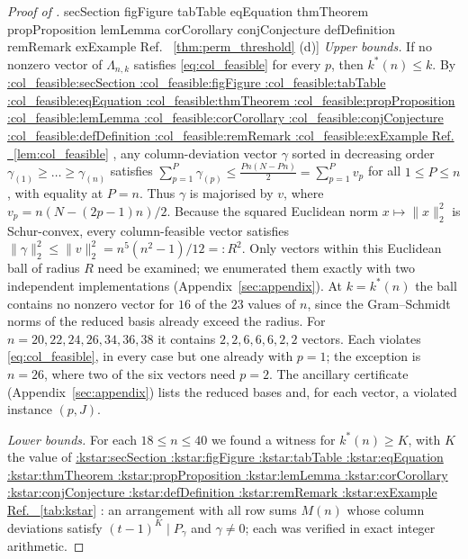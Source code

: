 \documentclass[11pt,a4paper]{article}
\makeatletter
\def\Cref@getprefix#1:#2\relax{#1}
\def\Cref@prefix@sec{sec}
\def\Cref@prefix@fig{fig}
\def\Cref@prefix@tab{tab}
\def\Cref@prefix@eq{eq}
\def\Cref@prefix@thm{thm}
\def\Cref@prefix@prop{prop}
\def\Cref@prefix@lem{lem}
\def\Cref@prefix@cor{cor}
\def\Cref@prefix@conj{conj}
\def\Cref@prefix@def{def}
\def\Cref@prefix@rem{rem}
\def\Cref@prefix@ex{ex}
\def\Cref@type@cap#1{%
  \edef\Cref@tmp{#1}%
  \ifx\Cref@tmp\Cref@prefix@sec Section%
  \else\ifx\Cref@tmp\Cref@prefix@fig Figure%
  \else\ifx\Cref@tmp\Cref@prefix@tab Table%
  \else\ifx\Cref@tmp\Cref@prefix@eq Equation%
  \else\ifx\Cref@tmp\Cref@prefix@thm Theorem%
  \else\ifx\Cref@tmp\Cref@prefix@prop Proposition%
  \else\ifx\Cref@tmp\Cref@prefix@lem Lemma%
  \else\ifx\Cref@tmp\Cref@prefix@cor Corollary%
  \else\ifx\Cref@tmp\Cref@prefix@conj Conjecture%
  \else\ifx\Cref@tmp\Cref@prefix@def Definition%
  \else\ifx\Cref@tmp\Cref@prefix@rem Remark%
  \else\ifx\Cref@tmp\Cref@prefix@ex Example%
  \else Ref.%
  \fi\fi\fi\fi\fi\fi\fi\fi\fi\fi\fi\fi
}
\DeclareRobustCommand{\Cref}[1]{%
  \begingroup
  \edef\Cref@label{#1}%
  \edef\Cref@prefix{\expandafter\Cref@getprefix\Cref@label:\relax}%
  \hyperref[#1]{\Cref@type@cap{\Cref@prefix}~\ref*{#1}}%
  \endgroup
}
\theoremstyle{plain}
\theoremstyle{definition}
\theoremstyle{remark}
\makeatother
\begin{document}
\begin{proof}[Proof of \Cref{thm:perm_threshold}(d)]
\emph{Upper bounds.}  If no nonzero vector of $\Lambda_{n,k}$ satisfies \eqref{eq:col_feasible} for every $p$, then $k^*(n)\le k$.
By \Cref{lem:col_feasible}, any column-deviation vector $\gamma$ sorted in decreasing order $\gamma_{(1)}\ge\dots\ge\gamma_{(n)}$ satisfies $\sum_{p=1}^P\gamma_{(p)}\le \frac{Pn(N-Pn)}{2}=\sum_{p=1}^P v_p$ for all $1\le P\le n$, with equality at $P=n$. Thus $\gamma$ is majorised by $v$, where $v_p=n(N-(2p-1)n)/2$. Because the squared Euclidean norm $x\mapsto\|x\|_2^2$ is Schur-convex, every column-feasible vector satisfies $\|\gamma\|_2^2\le\|v\|_2^2=n^5(n^2-1)/12=:R^2$. Only vectors within this Euclidean ball of radius $R$ need be examined; we enumerated them exactly with two independent implementations (Appendix~\ref{sec:appendix}).
At $k=k^*(n)$ the ball contains no nonzero vector for $16$ of the $23$ values of $n$, since the Gram--Schmidt norms of the reduced basis already exceed the radius.
For $n=20,22,24,26,34,36,38$ it contains $2,2,6,6,6,2,2$ vectors.
Each violates \eqref{eq:col_feasible}, in every case but one already with $p=1$; the exception is $n=26$, where two of the six vectors need $p=2$.
The ancillary certificate (Appendix~\ref{sec:appendix}) lists the reduced bases and, for each vector, a violated instance $(p,J)$.

\emph{Lower bounds.}  For each $18\le n\le40$ we found a witness for $k^*(n)\ge K$, with $K$ the value of \Cref{tab:kstar}: an arrangement with all row sums $M(n)$ whose column deviations satisfy $(t-1)^{K}\mid P_\gamma$ and $\gamma\ne0$; each was verified in exact integer arithmetic.
\end{proof}
\end{document}
